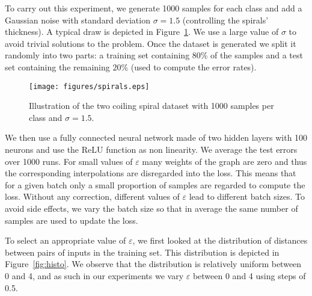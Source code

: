 \documentclass[twoside]{article}
\numberwithin{intassumption}{assumption}
\begin{document}
To carry out this experiment, we generate 1000 samples for each class and add a Gaussian noise with standard deviation $\sigma = 1.5$ (controlling the spirals' thickness). A typical draw is depicted in Figure~\ref{fig:spirals}. We use a large value of $\sigma$ to avoid trivial solutions to the problem. Once the dataset is generated we split it randomly into two parts: a training set containing 80\% of the samples and a test set containing the remaining 20\% (used to compute the error rates).
\begin{figure}
    \centering
    \texttt{[image: figures/spirals.eps]}
    \caption{Illustration of the two coiling spiral dataset with 1000 samples per class and $\sigma = 1.5$.}
    \label{fig:spirals}
\end{figure}
We then use a fully connected neural network made of two hidden layers with 100 neurons and use the ReLU function as non linearity. We average the test errors over 1000 runs. 
For small values of $\varepsilon$ many weights of the graph are zero and thus the corresponding interpolations are disregarded into the loss. This means that for a given batch only a small proportion of samples are regarded to compute the loss. Without any correction, different values of $\varepsilon$ lead to different batch sizes. To avoid side effects, we vary the batch size so that in average the same number of samples are used to update the loss.

To select an appropriate value of $\varepsilon$, we first looked at the distribution of distances between pairs of inputs in the training set. This distribution is depicted in Figure~\ref{fig:histo}. We observe that the distribution is relatively uniform between 0 and 4, and as such in our experiments we vary $\varepsilon$ between 0 and 4 using steps of 0.5.
\end{document}
